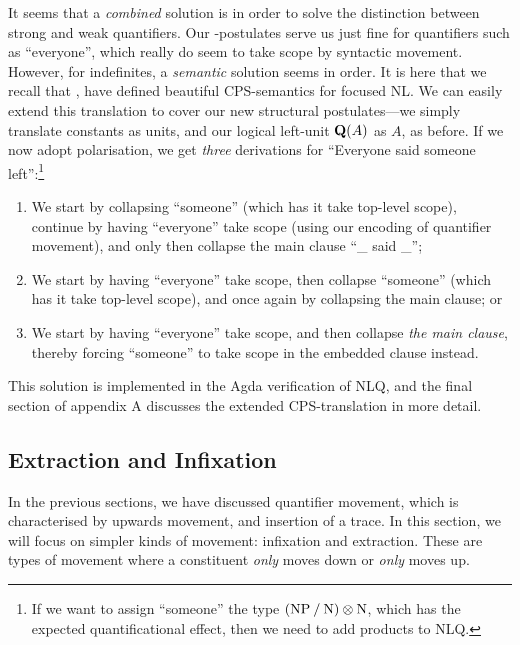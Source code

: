 It seems that a \emph{combined} solution is in order to solve the
distinction between strong and weak quantifiers. Our \I\B\C-postulates
serve us just fine for quantifiers such as ``everyone'', which really
do seem to take scope by syntactic movement. However, for indefinites,
a \emph{semantic} solution seems in order.
It is here that we recall that \citet{bastenhof2012},
\citet{moortgat2012} have defined beautiful CPS-semantics for focused
NL.
We can easily extend this translation to cover our new structural
postulates---we simply translate constants as units, and our logical
left-unit $\q[A]$ as $A$, as before. If we now adopt
 polarisation, we get \emph{three} derivations
for ``Everyone said someone left'':\footnote{%
  If we want to assign ``someone'' the type $(\NP\impl\N)\otimes\N$,
  which has the expected quantificational effect, then we need to add
  products to NLQ.
}
\begin{enumerate}
\item We start by collapsing ``someone'' (which has it take top-level
  scope), continue by having ``everyone'' take scope (using our
  encoding of quantifier movement), and only then collapse the main
  clause ``\_ said \_'';
\item We start by having ``everyone'' take scope, then collapse
  ``someone'' (which has it take top-level scope), and once again by
  collapsing the main clause; or
\item We start by having ``everyone'' take scope, and then collapse
  \emph{the main clause}, thereby forcing ``someone'' to take scope in
  the embedded clause instead.
\end{enumerate}
This solution is implemented in the Agda verification of NLQ, and the
final section of appendix A discusses the extended CPS-translation in
more detail.

\subsection{Extraction and Infixation}
In the previous sections, we have discussed quantifier movement, which
is characterised by upwards movement, and insertion of a trace. In
this section, we will focus on simpler kinds of movement: infixation
and extraction. These are types of movement where a constituent
\emph{only} moves down or \emph{only} moves up.

